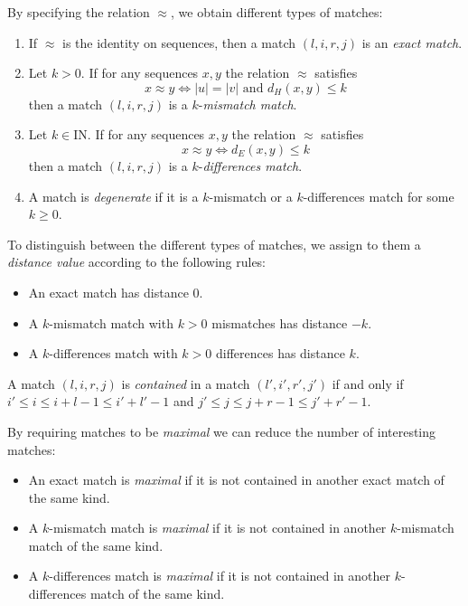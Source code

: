 \documentclass[12pt,titlepage]{article}
\newcommand{\Iff}{if and only if\xspace}
\newcommand{\Nats}{\textrm{I}\!\textrm{N}}
\begin{document}
\begin{AboutVmatch}
By specifying the relation \(\approx\), we obtain different types of matches:
\begin{enumerate}
\item
If \(\approx\) is the identity on sequences, then a match \((l,i,r,j)\) is
an \emph{exact match}.
\item
Let \(k>0\). If for any sequences \(x,y\) the relation \(\approx\) satisfies 
\[x\approx y\iff |u|=|v|\mbox{ and }d_{H}(x,y)\leq k\] 
then a match \((l,i,r,j)\) is a \(k\)-\emph{mismatch match}.
\item
Let \(k\in\Nats\). If for any sequences \(x,y\) the relation \(\approx\) 
satisfies \[x \approx y\iff d_{E}(x,y)\leq k\] then a match 
\((l,i,r,j)\) is a \(k\)-\emph{differences match}.
\item
A match is \emph{degenerate} if it is a \(k\)-mismatch or a \(k\)-differences
match for some \(k\geq 0\).
\end{enumerate}
To distinguish between the different types of matches, we assign to them 
a \emph{distance value} according to the following rules:
\begin{itemize}
\item
An exact match has distance 0.
\item
A \(k\)-mismatch match with \(k>0\) mismatches has distance \(-k\).
\item
A \(k\)-differences match with \(k>0\) differences has distance \(k\).
\end{itemize}

A match \((l,i,r,j)\) is \emph{contained} in a match \((l',i',r',j')\) \Iff
\(i'\leq i\leq i+l-1\leq i'+l'-1\) and 
\(j'\leq j\leq j+r-1\leq j'+r'-1\).

By requiring matches to be \emph{maximal} we can reduce the number of
interesting matches:
\begin{itemize}
\item
An exact match is \emph{maximal} if it is not contained in another 
exact match of the same kind. 
\item
A \(k\)-mismatch match is \emph{maximal} if it is not contained in another 
\(k\)-mismatch match of the same kind. 
\item
A \(k\)-differences match is \emph{maximal} if it is not contained in another 
\(k\)-differences match of the same kind. 
\end{itemize}


\end{AboutVmatch}
\end{document}
